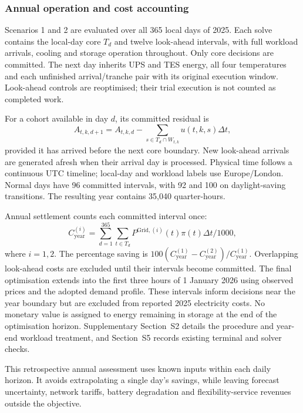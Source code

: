 \subsubsection{Annual operation and cost accounting}\label{sec:annual-operation}
Scenarios 1 and 2 are evaluated over all 365 local days of 2025. Each solve contains the local-day core $T_d$ and twelve look-ahead intervals, with full workload arrivals, cooling and storage operation throughout. Only core decisions are committed. The next day inherits UPS and TES energy, all four temperatures and each unfinished arrival/tranche pair with its original execution window. Look-ahead controls are reoptimised; their trial execution is not counted as completed work.

For a cohort available in day $d$, its committed residual is
\begin{equation}
A_{t,k,d+1}=A_{t,k,d}-\sum_{s\in T_d\cap W_{t,k}}u(t,k,s)\Delta t,
\label{eq:cohort-handoff}
\end{equation}
provided it has arrived before the next core boundary. New look-ahead arrivals are generated afresh when their arrival day is processed. Physical time follows a continuous UTC timeline; local-day and workload labels use Europe/London. Normal days have 96 committed intervals, with 92 and 100 on daylight-saving transitions. The resulting year contains 35,040 quarter-hours.

Annual settlement counts each committed interval once:
\begin{equation}
C^{(i)}_{\mathrm{year}}=\sum_{d=1}^{365}\sum_{t\in T_d}P^{\mathrm{Grid},(i)}(t)\pi(t)\Delta t/1000,
\label{eq:annual-cost}
\end{equation}
where $i=1,2$. The percentage saving is $100(C^{(1)}_{\mathrm{year}}-C^{(2)}_{\mathrm{year}})/C^{(1)}_{\mathrm{year}}$. Overlapping look-ahead costs are excluded until their intervals become committed. The final optimisation extends into the first three hours of 1 January 2026 using observed prices and the adopted demand profile. These intervals inform decisions near the year boundary but are excluded from reported 2025 electricity costs. No monetary value is assigned to energy remaining in storage at the end of the optimisation horizon. Supplementary Section~S2 details the procedure and year-end workload treatment, and Section~S5 records existing terminal and solver checks.

This retrospective annual assessment uses known inputs within each daily horizon. It avoids extrapolating a single day's savings, while leaving forecast uncertainty, network tariffs, battery degradation and flexibility-service revenues outside the objective.
